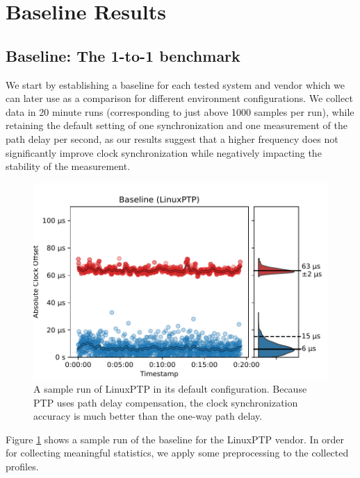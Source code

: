 
\section{Baseline Results}

\subsection{Baseline: The 1-to-1 benchmark}

We start by establishing a baseline for each tested system and vendor which we can later use as a comparison for different environment configurations. We collect data in 20 minute runs (corresponding to just above 1000 samples per run), while retaining the default setting of one synchronization and one measurement of the path delay per second, as our results suggest that a higher frequency does not significantly improve clock synchronization while negatively impacting the stability of the measurement.

\begin{figure}
    \includegraphics[width=\linewidth]{res/generated/base/sample.pdf}
    \caption{A sample run of LinuxPTP in its default configuration. Because PTP uses path delay compensation, the clock synchronization accuracy is much better than the one-way path delay.}
    \label{fig:baseline_sample}
\end{figure}

Figure \ref{fig:baseline_sample} shows a sample run of the baseline for the LinuxPTP vendor. In order for collecting meaningful statistics, we apply some preprocessing to the collected profiles. 

